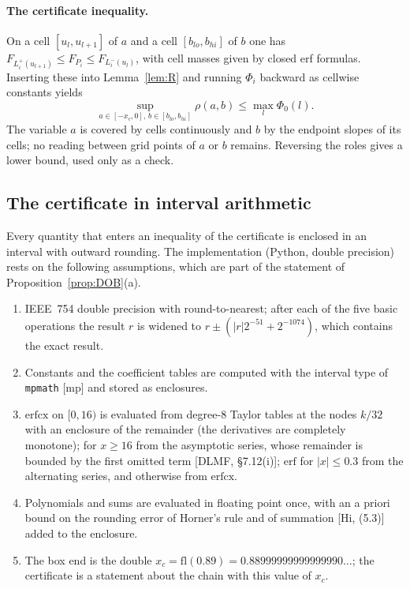 \documentclass[11pt,a4paper]{article}
\theoremstyle{definition}
\theoremstyle{remark}
\newcommand{\xc}{x_c}
\newcommand{\code}[1]{\texttt{#1}}
\begin{document}
\paragraph{The certificate inequality.} On a cell $[u_l,u_{l+1}]$ of $a$ and a cell $[b_{lo},b_{hi}]$ of $b$ one has $F_{L^+_i(u_{l+1})}\le F_{P_i}\le F_{L^-_i(u_l)}$, with cell masses given by closed erf formulas. Inserting these into Lemma~\ref{lem:R} and running $\Phi_i$ backward as cellwise constants yields
\[
\sup_{a\in[-\xc,0],\,b\in[b_{lo},b_{hi}]}\rho(a,b)\le\max_l\Phi_0(l).
\]
The variable $a$ is covered by cells continuously and $b$ by the endpoint slopes of its cells; no reading between grid points of $a$ or $b$ remains. Reversing the roles gives a lower bound, used only as a check.

\subsection{The certificate in interval arithmetic}\label{sec:discipline}
Every quantity that enters an inequality of the certificate is enclosed in an interval with outward rounding. The implementation (Python, double precision) rests on the following assumptions, which are part of the statement of Proposition~\ref{prop:DOB}(a).
\begin{enumerate}[leftmargin=*,label=(A\arabic*)]
\item IEEE~754 double precision with round-to-nearest; after each of the five basic operations the result $r$ is widened to $r\pm(|r|2^{-51}+2^{-1074})$, which contains the exact result.
\item Constants and the coefficient tables are computed with the interval type of \code{mpmath} [mp] and stored as enclosures.
\item $\mathrm{erfcx}$ on $[0,16)$ is evaluated from degree-$8$ Taylor tables at the nodes $k/32$ with an enclosure of the remainder (the derivatives are completely monotone); for $x\ge16$ from the asymptotic series, whose remainder is bounded by the first omitted term [DLMF, \S7.12(i)]; $\mathrm{erf}$ for $|x|\le0.3$ from the alternating series, and otherwise from $\mathrm{erfcx}$.
\item Polynomials and sums are evaluated in floating point once, with an a priori bound on the rounding error of Horner's rule and of summation [Hi, (5.3)] added to the enclosure.
\item The box end is the double $\xc=\mathrm{fl}(0.89)=0.88999999999999990\ldots$; the certificate is a statement about the chain with this value of $\xc$.
\end{enumerate}
\end{document}
